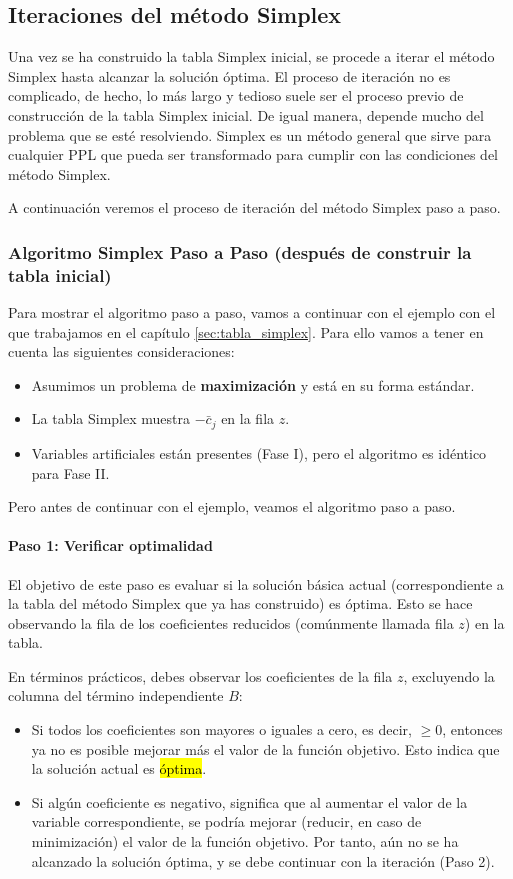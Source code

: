 \subsection{Iteraciones del método Simplex}
\label{sec:iteraciones_simplex}

Una vez se ha construido la tabla Simplex inicial, se procede a iterar el método Simplex hasta alcanzar la solución óptima. El proceso de iteración no es complicado, de hecho, lo más largo y tedioso suele ser el proceso previo de construcción de la tabla Simplex inicial. De igual manera, depende mucho del problema que se esté resolviendo. Simplex es un método general que sirve para cualquier PPL que pueda ser transformado para cumplir con las condiciones del método Simplex.

A continuación veremos el proceso de iteración del método Simplex paso a paso.

\subsubsection{Algoritmo Simplex Paso a Paso (después de construir la tabla inicial)}
Para mostrar el algoritmo paso a paso, vamos a continuar con el ejemplo con el que trabajamos en el capítulo \ref{sec:tabla_simplex}. Para ello vamos a tener en cuenta las siguientes consideraciones:
\begin{itemize}
  \item Asumimos un problema de \textbf{maximización} y está en su forma estándar.
  \item La tabla Simplex muestra \(-\bar{c}_j\) en la fila \(z\).
  \item Variables artificiales están presentes (Fase I), pero el algoritmo es idéntico para Fase II.
\end{itemize}

Pero antes de continuar con el ejemplo, veamos el algoritmo paso a paso.

\paragraph{Paso 1: Verificar optimalidad}

El objetivo de este paso es evaluar si la solución básica actual (correspondiente a la tabla del método Simplex que ya has construido) es óptima. Esto se hace observando la fila de los coeficientes reducidos (comúnmente llamada fila \(z\)) en la tabla.

En términos prácticos, debes observar los coeficientes de la fila \(z\), excluyendo la columna del término independiente \(B\):
\begin{itemize}
  \item Si todos los coeficientes son mayores o iguales a cero, es decir, \(\geq 0\), entonces ya no es posible mejorar más el valor de la función objetivo. Esto indica que la solución actual es \hl{óptima}.
  \item Si algún coeficiente es negativo, significa que al aumentar el valor de la variable correspondiente, se podría mejorar (reducir, en caso de minimización) el valor de la función objetivo. Por tanto, aún no se ha alcanzado la solución óptima, y se debe continuar con la iteración (Paso 2).
\end{itemize}

